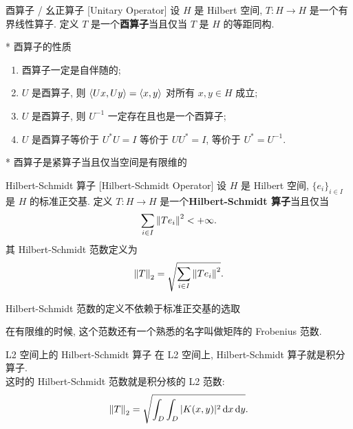         \begin{vardfn}
            {酉算子 / 幺正算子}
            [Unitary Operator]
            设 \(H\) 是 Hilbert 空间, \(T: H \to H\) 是一个有界线性算子. 定义 \(T\) 是一个\textbf{酉算子}当且仅当 \(T\) 是 \(H\) 的等距同构.
        \end{vardfn}

        \begin{varthm}*
            {酉算子的性质}
            \begin{enumerate}[label=(\roman*)]
                \item 酉算子一定是自伴随的;
                \item \(U\) 是酉算子, 则 \(\expval{Ux, Uy} = \expval{x, y}\) 对所有 \(x, y \in H\) 成立;
                \item \(U\) 是酉算子, 则 \(U^{-1}\) 一定存在且也是一个酉算子; 
                \item \(U\) 是酉算子等价于 \(U^* U = I\) 等价于 \(U U^* = I\), 等价于 \(U^* = U^{-1}\).
            \end{enumerate}
        \end{varthm}

        \begin{varthm}*
            {酉算子是紧算子当且仅当空间是有限维的}
        \end{varthm}

        \begin{xmp}
            {Hilbert-Schmidt 算子}
            [Hilbert-Schmidt Operator]
            设 \(H\) 是 Hilbert 空间, \(\{e_i\}_{i\in I}\) 是 \(H\) 的标准正交基. 定义 \(T: H \to H\) 是一个\textbf{Hilbert-Schmidt 算子}当且仅当
            \[\sum_{i\in I} \norm{Te_i}^2 < +\infty.\]
            其 Hilbert-Schmidt 范数定义为
            \[\norm{T}_2 = \sqrt{\sum_{i\in I} \norm{Te_i}^2}.\]
        \end{xmp}

        \begin{ppt}
            {Hilbert-Schmidt 范数的定义不依赖于标准正交基的选取}
        \end{ppt}

        \begin{rmk}
            [Dedicatia]
            在有限维的时候, 这个范数还有一个熟悉的名字叫做矩阵的 Frobenius 范数.
        \end{rmk}

        \begin{ppt}
            {L2 空间上的 Hilbert-Schmidt 算子}
            在 L2 空间上, Hilbert-Schmidt 算子就是积分算子. \\
            这时的 Hilbert-Schmidt 范数就是积分核的 L2 范数:
            \[\norm{T}_2 = \sqrt{\int_D\int_D |K(x,y)|^2 \dd{x}\dd{y}}.\]
        \end{ppt}

